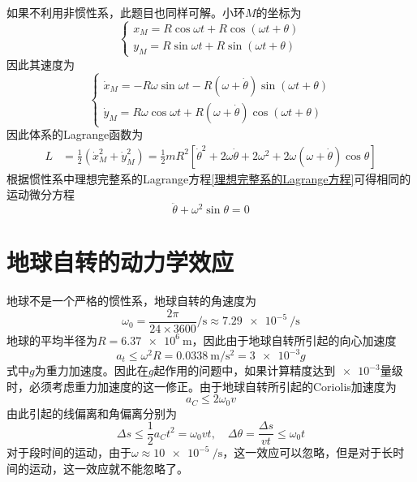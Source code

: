 \begin{solution}
如果不利用非惯性系，此题目也同样可解。小环$M$的坐标为
\begin{equation*}
	\begin{cases}
		x_M = R\cos \omega t + R\cos (\omega t+\theta) \\
		y_M = R\sin \omega t + R\sin (\omega t+\theta)
	\end{cases}
\end{equation*}
因此其速度为
\begin{equation*}
	\begin{cases}
		\dot{x}_M = -R\omega \sin \omega t - R(\omega + \dot{\theta}) \sin (\omega t+\theta) \\
		\dot{y}_M = R \omega \cos \omega t + R(\omega + \dot{\theta}) \cos (\omega t+\theta)
	\end{cases}
\end{equation*}
因此体系的Lagrange函数为
\begin{align*}
	L & = \frac12 (\dot{x}_M^2 + \dot{y}_M^2) = \frac12 mR^2 \left[\dot{\theta}^2 + 2\omega \dot{\theta} + 2\omega^2 + 2\omega(\omega+ \dot{\theta}) \cos \theta\right]
\end{align*}
根据惯性系中理想完整系的Lagrange方程\eqref{理想完整系的Lagrange方程}可得相同的运动微分方程
\begin{equation*}
	\ddot{\theta} + \omega^2 \sin \theta = 0
\end{equation*}
\end{solution}

\section{地球自转的动力学效应}

地球不是一个严格的惯性系，地球自转的角速度为
\begin{equation*}
	\omega_0 = \frac{2\pi}{24 \times 3600}\si{\per\second} \approx \SI{7.29e-5}{\per\second}
\end{equation*}
地球的平均半径为$R = \SI{6.37e6}{\meter}$，因此由于地球自转所引起的向心加速度
\begin{equation*}
	a_t \leqslant \omega^2 R = \SI[per-mode=symbol]{0.0338}{\meter\per\second\squared} = \num{3e-3} g
\end{equation*}
式中$g$为重力加速度。因此在$g$起作用的问题中，如果计算精度达到$\num{e-3}$量级时，必须考虑重力加速度的这一修正。由于地球自转所引起的Coriolis加速度为
\begin{equation*}
	a_C \leqslant 2\omega_0 v
\end{equation*}
由此引起的线偏离和角偏离分别为
\begin{equation*}
	\Delta s \leqslant \frac12 a_C t^2 = \omega_0 vt,\quad \Delta \theta = \frac{\Delta s}{vt} \leqslant \omega_0 t
\end{equation*}
对于段时间的运动，由于$\omega \approx \SI{10e-5}{\per\second}$，这一效应可以忽略，但是对于长时间的运动，这一效应就不能忽略了。


